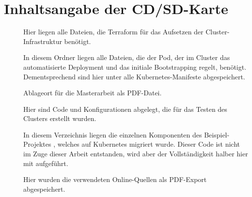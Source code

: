 \chapter{Inhaltsangabe der CD/SD-Karte}
\label{ch:Inhaltsangabe der CD/SD-Karte}


\begin{description}
  \item[] \hfill \break
  Hier liegen alle Dateien, die Terraform f\"ur das Aufsetzen der
  Cluster-Infrastruktur ben\"otigt.
  \item[] \hfill \break
  In diesem Ordner liegen alle Dateien, die der Pod, der im Cluster das
  automatisierte Deployment und das initiale Bootstrapping regelt, ben\"otigt.
  Dementsprechend sind hier unter  alle Kubernetes-Manifeste
  abgespeichert.
  \item[] \hfill \break
  Ablageort f\"ur die Masterarbeit als PDF-Datei.
  \item[] \hfill \break
  Hier sind Code und
  Konfigurationen abgelegt, die f\"ur das Testen des Clusters
  erstellt wurden.
  \item[] \hfill \break
  In diesem Verzeichnis liegen die einzelnen Komponenten des
  Beispiel-Projektes ,
  welches auf Kubernetes migriert wurde. Dieser Code ist nicht im Zuge dieser
  Arbeit entstanden, wird aber der Vollst\"andigkeit halber hier mit aufgef\"uhrt.
  \item[] \hfill \break
  Hier wurden die verwendeten Online-Quellen als PDF-Export abgespeichert.
\end{description}
